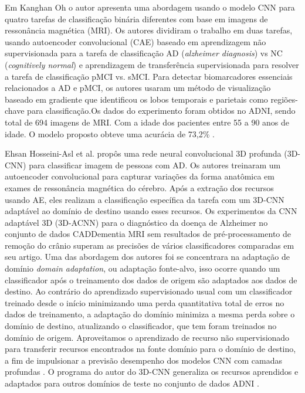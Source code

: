 \documentclass[openright]{UFRGS} %
\begin{document}
Em Kanghan Oh o autor apresenta uma abordagem usando o modelo CNN para quatro tarefas de classificação binária diferentes com base em imagens de ressonância magnética (MRI). Os autores dividiram o trabalho em duas tarefas, usando autoencoder convolucional (CAE) baseado em aprendizagem não supervisionada para a tarefa de classificação AD (\textit{alzheimer diagnosis}) vs NC (\textit{cognitively normal}) e aprendizagem de transferência supervisionada para resolver a tarefa de classificação pMCI vs. sMCI. Para detectar biomarcadores essenciais relacionados a AD e pMCI, os autores usaram um método de visualização baseado em gradiente que identificou os lobos temporais e parietais como regiões-chave para classificação.Os dados do experimento foram obtidos no ADNI, sendo total de  694 imagens de MRI. Com a idade dos pacientes entre 55 a 90 anos de idade. O modelo proposto obteve uma acurácia de 73,2\% \cite{oh2019classification}.



Ehsan Hosseini-Asl et al. propôs uma rede neural convolucional 3D profunda (3D-CNN) para classificar imagem de pessoas com AD. Os autores treinaram um autoencoder convolucional para capturar variações da forma anatômica em exames de ressonância magnética do cérebro. Após a extração dos recursos usando AE, eles realizam a classificação específica da tarefa com um 3D-CNN adaptável ao domínio de destino usando esses recursos. Os experimentos da CNN adaptável 3D (3D-ACNN) para o diagnóstico da doença de Alzheimer no conjunto de dados CADDementia MRI sem resultados de pré-processamento de remoção do crânio superam as precisões de vários classificadores comparadas em seu artigo.
Uma das abordagem dos autores foi se concentrara na adaptação de domínio  \textit{ domain adaptation}, ou adaptação
fonte-alvo, isso ocorre quando um classificador após o treinamento dos dados de origem são adaptados 
aos dados de destino.
Ao contrário do aprendizado supervisionado usual com um classificador treinado desde o início
minimizando uma perda quantitativa total de erros no
dados de treinamento, a adaptação do domínio minimiza a mesma perda
sobre o domínio de destino, atualizando o classificador, que tem
foram treinados no domínio de origem. Aproveitamos o aprendizado de recurso 
não supervisionado para transferir recursos encontrados na fonte
domínio para o domínio de destino, a fim de impulsionar a previsão
desempenho dos modelos CNN com camadas profundas \cite{hosseini2016alzheimer}. O programa do autor do 3D-CNN generaliza os recursos aprendidos e adaptados para outros domínios de teste no conjunto de dados ADNI \cite{hosseini2016alzheimer}.
\end{document}
